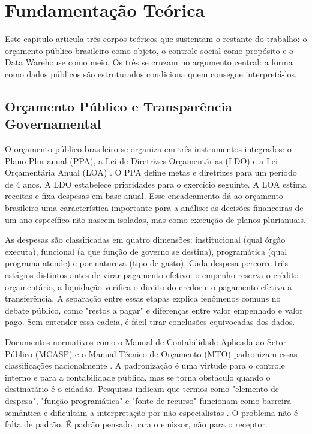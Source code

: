 \chapter{Fundamentação Teórica}
\label{cap:fundamentacao}

Este capítulo articula três corpos teóricos que sustentam o restante do trabalho: o orçamento público brasileiro como objeto, o controle social como propósito e o Data Warehouse como meio. Os três se cruzam no argumento central: a forma como dados públicos são estruturados condiciona quem consegue interpretá-los.

\section{Orçamento Público e Transparência Governamental}

O orçamento público brasileiro se organiza em três instrumentos integrados: o Plano Plurianual (PPA), a Lei de Diretrizes Orçamentárias (LDO) e a Lei Orçamentária Anual (LOA) \cite{giacomoni2021orcamento}. O PPA define metas e diretrizes para um período de 4 anos. A LDO estabelece prioridades para o exercício seguinte. A LOA estima receitas e fixa despesas em base anual. Esse encadeamento dá ao orçamento brasileiro uma característica importante para a análise: as decisões financeiras de um ano específico não nascem isoladas, mas como execução de planos plurianuais.

As despesas são classificadas em quatro dimensões: institucional (qual órgão executa), funcional (a que função de governo se destina), programática (qual programa atende) e por natureza (tipo de gasto). Cada despesa percorre três estágios distintos antes de virar pagamento efetivo: o empenho reserva o crédito orçamentário, a liquidação verifica o direito do credor e o pagamento efetiva a transferência. A separação entre essas etapas explica fenômenos comuns no debate público, como "restos a pagar" e diferenças entre valor empenhado e valor pago. Sem entender essa cadeia, é fácil tirar conclusões equivocadas dos dados.

Documentos normativos como o Manual de Contabilidade Aplicada ao Setor Público (MCASP) e o Manual Técnico de Orçamento (MTO) padronizam essas classificações nacionalmente \cite{MCASP,MTO}. A padronização é uma virtude para o controle interno e para a contabilidade pública, mas se torna obstáculo quando o destinatário é o cidadão. Pesquisas indicam que termos como "elemento de despesa", "função programática" e "fonte de recurso" funcionam como barreira semântica e dificultam a interpretação por não especialistas \cite{melo2019proposta,marco2022transparencia}. O problema não é falta de padrão. É padrão pensado para o emissor, não para o receptor.


